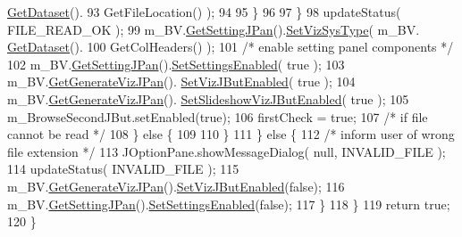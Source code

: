 \begin{DoxyCode}
      \hyperlink{class_bob_viz_ab8866566b53e78c66e29a4d68406b860}{GetDataset}().
93                                     GetFileLocation() );
94                             
95                         \}
96                             
97                     \}
98                     updateStatus( FILE\_READ\_OK );
99                     m\_BV.\hyperlink{class_bob_viz_a10dab616869fe644d16c2ccf78627af5}{GetSettingJPan}().\hyperlink{class_setting_j_panel_afb2b0736bdf6a8a724066b4a7c78a25f}{SetVizSysType}( m\_BV.
      \hyperlink{class_bob_viz_ab8866566b53e78c66e29a4d68406b860}{GetDataset}().
100                             GetColHeaders() );
101                     \textcolor{comment}{/* enable setting panel components */}
102                     m\_BV.\hyperlink{class_bob_viz_a10dab616869fe644d16c2ccf78627af5}{GetSettingJPan}().\hyperlink{class_setting_j_panel_a0867f721026a690933334532d59fd1c0}{SetSettingsEnabled}( \textcolor{keyword}{true} );
103                     m\_BV.\hyperlink{class_bob_viz_a4b1e563e0fa60594fa0beb1d50438824}{GetGenerateVizJPan}().
      \hyperlink{class_selection_viz_j_panel_ab942f7a1e094e8d3df0df172499c8878}{SetVizJButEnabled}( \textcolor{keyword}{true} );
104                     m\_BV.\hyperlink{class_bob_viz_a4b1e563e0fa60594fa0beb1d50438824}{GetGenerateVizJPan}().
      \hyperlink{class_selection_viz_j_panel_afe28337fc26eb95b02450f6138977c90}{SetSlideshowVizJButEnabled}( \textcolor{keyword}{true} );
105                     m\_BrowseSecondJBut.setEnabled(\textcolor{keyword}{true});
106                     firstCheck = \textcolor{keyword}{true};
107                 \textcolor{comment}{/* if file cannot be read */}
108                 \} \textcolor{keywordflow}{else} \{
109                     
110                 \}
111             \} \textcolor{keywordflow}{else} \{
112                 \textcolor{comment}{/* inform user of wrong file extension */}
113                 JOptionPane.showMessageDialog( null, INVALID\_FILE );
114                 updateStatus( INVALID\_FILE );
115                 m\_BV.\hyperlink{class_bob_viz_a4b1e563e0fa60594fa0beb1d50438824}{GetGenerateVizJPan}().\hyperlink{class_selection_viz_j_panel_ab942f7a1e094e8d3df0df172499c8878}{SetVizJButEnabled}(\textcolor{keyword}{false});
116                 m\_BV.\hyperlink{class_bob_viz_a10dab616869fe644d16c2ccf78627af5}{GetSettingJPan}().\hyperlink{class_setting_j_panel_a0867f721026a690933334532d59fd1c0}{SetSettingsEnabled}(\textcolor{keyword}{false});
117             \}
118         \}
119         \textcolor{keywordflow}{return} \textcolor{keyword}{true};
120     \}
\end{DoxyCode}
